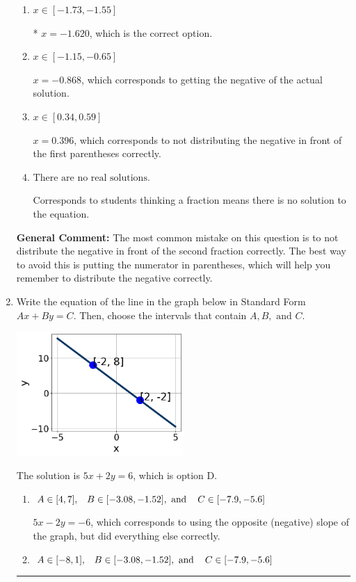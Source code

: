 \documentclass{extbook}[14pt]
\newcommand{\litem}[1]{\item #1

\rule{\textwidth}{0.4pt}}
\begin{document}
\begin{enumerate}
{\begin{enumerate}[label=\Alph*.]
$x = -0.396$, which corresponds to not distributing the negative in front of the second parentheses correctly.
\item \( x \in [-1.73, -1.55] \)

* $x = -1.620$, which is the correct option.
\item \( x \in [-1.15, -0.65] \)

$x = -0.868$, which corresponds to getting the negative of the actual solution.
\item \( x \in [0.34, 0.59] \)

$x = 0.396$, which corresponds to not distributing the negative in front of the first parentheses correctly.
\item \( \text{There are no real solutions.} \)

Corresponds to students thinking a fraction means there is no solution to the equation.
\end{enumerate}

\textbf{General Comment:} The most common mistake on this question is to not distribute the negative in front of the second fraction correctly. The best way to avoid this is putting the numerator in parentheses, which will help you remember to distribute the negative correctly.
}
\litem{
Write the equation of the line in the graph below in Standard Form $Ax+By=C$. Then, choose the intervals that contain $A, B, \text{ and } C$.

\begin{center}
    \includegraphics[width=0.5\textwidth]{../Figures/linearGraphToStandardB.png}
\end{center}


The solution is \( 5x + 2y = 6 \), which is option D.\begin{enumerate}[label=\Alph*.]
\item \( A \in [4, 7], \hspace{3mm} B \in [-3.08, -1.52], \text{ and } \hspace{3mm} C \in [-7.9, -5.6] \)

 $5x - 2y = -6$, which corresponds to using the opposite (negative) slope of the graph, but did everything else correctly.
\item \( A \in [-8, 1], \hspace{3mm} B \in [-3.08, -1.52], \text{ and } \hspace{3mm} C \in [-7.9, -5.6] \)


\end{enumerate}}
\end{enumerate}
\end{document}
